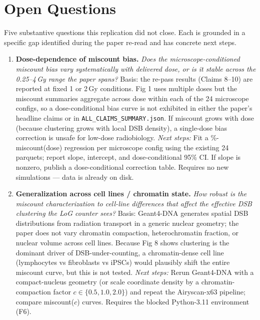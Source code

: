 \section{Open Questions}

Five substantive questions this replication did not close. Each is grounded in a
specific gap identified during the paper re-read and has concrete next steps.

\begin{enumerate}

\item \textbf{Dose-dependence of miscount bias.}
\emph{Does the microscope-conditioned miscount bias vary systematically with
delivered dose, or is it stable across the 0.25--4\,Gy range the paper spans?}
Basis: the re-pass results (Claims 8--10) are reported at fixed 1 or 2\,Gy
conditions. Fig 1 uses multiple doses but the miscount summaries aggregate
across dose within each of the 24 microscope configs, so a dose-conditional
bias curve is not exhibited in either the paper's headline claims or in
\texttt{ALL\_CLAIMS\_SUMMARY.json}. If miscount grows with dose (because
clustering grows with local DSB density), a single-dose bias correction is
unsafe for low-dose radiobiology.
\emph{Next steps:} Fit a \%-miscount(dose) regression per microscope config
using the existing 24 parquets; report slope, intercept, and dose-conditional
95\% CI. If slope is nonzero, publish a dose-conditional correction table.
Requires no new simulations --- data is already on disk.

\item \textbf{Generalization across cell lines / chromatin state.}
\emph{How robust is the miscount characterization to cell-line differences
that affect the effective DSB clustering the LoG counter sees?} Basis: Geant4-DNA
generates spatial DSB distributions from radiation transport in a generic
nuclear geometry; the paper does not vary chromatin compaction, heterochromatin
fraction, or nuclear volume across cell lines. Because Fig 8 shows clustering is
the dominant driver of DSB-under-counting, a chromatin-dense cell line
(lymphocytes vs fibroblasts vs iPSCs) would plausibly shift the entire miscount
curve, but this is not tested. \emph{Next steps:} Rerun Geant4-DNA with a
compact-nucleus geometry (or scale coordinate density by a chromatin-compaction
factor $c \in \{0.5, 1.0, 2.0\}$) and repeat the Airyscan-x63 pipeline; compare
miscount($c$) curves. Requires the blocked Python-3.11 environment (F6).


\end{enumerate}
